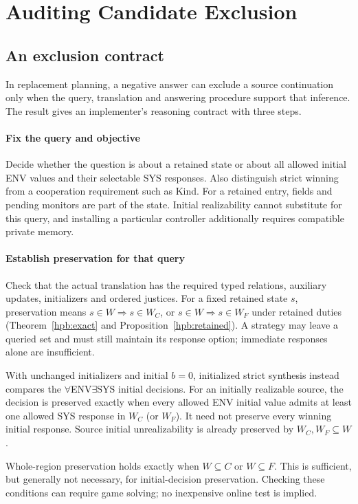 \section{Auditing Candidate Exclusion}\label{sec:discussion}
\subsection{An exclusion contract}
In replacement planning, a negative answer can exclude a source continuation only when the query,
translation and answering procedure support that inference. The result gives
an implementer's reasoning contract with three steps.

\paragraph{Fix the query and objective}
Decide whether the question is about a retained state or about all allowed
initial ENV values and their selectable SYS responses. Also distinguish strict
winning from a cooperation requirement such as Kind. For a retained entry,
fields and pending monitors are part of the state. Initial realizability
cannot substitute for this query, and installing a particular controller
additionally requires compatible private memory.

\paragraph{Establish preservation for that query}
Check that the actual translation has the required typed relations, auxiliary
updates, initializers and ordered justices. For a fixed retained state $s$,
preservation means $s\in W\Rightarrow s\in W_C$, or
$s\in W\Rightarrow s\in W_F$ under retained duties
(Theorem~\ref{hpb:exact} and Proposition~\ref{hpb:retained}). A strategy may
leave a queried set and must still maintain its response option; immediate
responses alone are insufficient.

With unchanged initializers and initial $b=0$, initialized strict synthesis
instead compares the $\forall$ENV$\exists$SYS initial decisions. For an
initially realizable source, the decision is preserved exactly when every
allowed ENV initial value admits at least one allowed SYS response in $W_C$
(or $W_F$). It need not preserve every winning initial response. Source
initial unrealizability is already preserved by $W_C,W_F\subseteq W$.

Whole-region preservation holds exactly when $W\subseteq C$ or
$W\subseteq F$. This is sufficient, but generally not necessary, for
initial-decision preservation. Checking these conditions can require game solving; no inexpensive online
test is implied.

